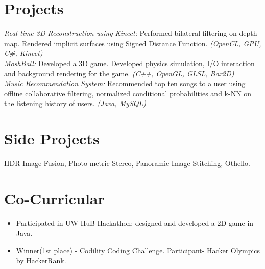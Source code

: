 \documentclass[margin]{res}
\begin{document}
\begin{resume}
\section{Projects}
{\it Real-time 3D Reconstruction using Kinect:} Performed bilateral filtering on depth map. Rendered implicit surfaces using Signed Distance Function. {\it(OpenCL, GPU, C\#, Kinect)}
\\{\it MoshBall:} Developed a 3D game. Developed physics simulation, I/O interaction and background rendering for the game. {\it (C++, OpenGL, GLSL, Box2D)}  
\\{\it Music Recommendation System:} Recommended top ten songs to a user using offline collaborative filtering, normalized conditional probabilities and k-NN on the listening history of users. {\it (Java, MySQL)}

\section{Side Projects}
HDR Image Fusion, Photo-metric Stereo, Panoramic Image Stitching, Othello.
\section{Co-Curricular}
\begin{itemize} \itemsep -2pt  %
 \item Participated in UW-HuB Hackathon; designed and developed a 2D game in Java.
 \item Winner(1st place) - Codility Coding Challenge. Participant- Hacker Olympics by HackerRank.
 \end{itemize}



\end{resume} 
\end{document}
